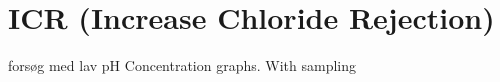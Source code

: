 \section{ICR (Increase Chloride Rejection)}

forsøg med lav pH
Concentration graphs. 
With sampling 